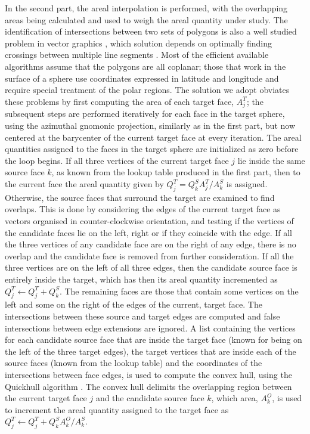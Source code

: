 In the second part, the areal interpolation is performed, with the overlapping areas being calculated and used to weigh the areal quantity under study. The identification of intersections between two sets of polygons is also a well studied problem in vector graphics \citep{Guibas1987, Chazelle1994}, which solution depends on optimally finding crossings between multiple line segments \citep{Bentley1979, Chazelle1992, Balaban1995}. Most of the efficient available algorithms assume that the polygons are all coplanar; those that work in the surface of a sphere use coordinates expressed in latitude and longitude and require special treatment of the polar regions. The solution we adopt obviates these problems by first computing the area of each target face, $A^{T}_{j}$; the subsequent steps are performed iteratively for each face in the target sphere, using the azimuthal gnomonic projection, similarly as in the first part, but now centered at the barycenter of the current target face at every iteration. The areal quantities assigned to the faces in the target sphere are initialized as zero before the loop begins. If all three vertices of the current target face $j$ lie inside the same source face $k$, as known from the lookup table produced in the first part, then to the current face the areal quantity given by $Q^{T}_{j} = Q^{S}_{k} A^{T}_{j} / A^{S}_{k}$ is assigned. Otherwise, the source faces that surround the target are examined to find overlaps. This is done by considering the edges of the current target face as vectors organised in counter-clockwise orientation, and testing if the vertices of the candidate faces lie on the left, right or if they coincide with the edge. If all the three vertices of any candidate face are on the right of any edge, there is no overlap and the candidate face is removed from further consideration. If all the three vertices are on the left of all three edges, then the candidate source face is entirely inside the target, which has then its areal quantity incremented as $Q^{T}_{j} \leftarrow Q^{T}_{j} + Q^{S}_{k}$. The remaining faces are those that contain some vertices on the left and some on the right of the edges of the current, target face. The intersections between these source and target edges are computed and false intersections between edge extensions are ignored. A list containing the vertices for each candidate source face that are inside the target face (known for being on the left of the three target edges), the target vertices that are inside each of the source faces (known from the lookup table) and the coordinates of the intersections between face edges, is used to compute the convex hull, using the Quickhull algorithm \citep{Barber1996}. The convex hull delimits the overlapping region between the current target face $j$ and the candidate source face $k$, which area, $A^{O}_{k}$, is used to increment the areal quantity assigned to the target face as $Q^{T}_{j} \leftarrow Q^{T}_{j} + Q^{S}_{k} A^{O}_{k}/A^{S}_{k}$.

